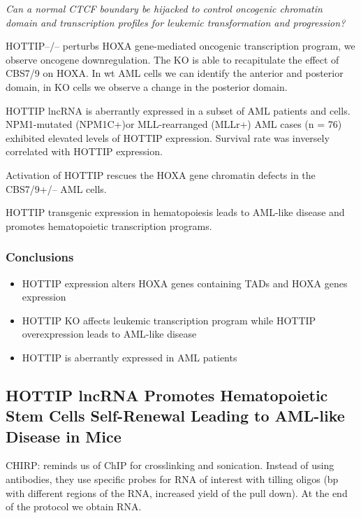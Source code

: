 \emph{Can a normal CTCF boundary be hijacked to control oncogenic chromatin domain and transcription profiles for leukemic transformation and progression?}

HOTTIP--/-- perturbs HOXA gene-mediated oncogenic transcription program, we observe oncogene downregulation. The KO is able to recapitulate the effect of CBS7/9 on HOXA. In wt AML cells we can identify the anterior and posterior domain, in KO cells we observe a change in the posterior domain.

HOTTIP lncRNA is aberrantly expressed in a subset of AML patients and cells. NPM1-mutated (NPM1C+)or MLL-rearranged (MLLr+) AML cases (n = 76) exhibited elevated levels of HOTTIP expression. Survival rate was inversely correlated with HOTTIP expression.

Activation of HOTTIP rescues the HOXA gene chromatin defects in the CBS7/9+/-- AML cells.

HOTTIP transgenic expression in hematopoiesis leads to AML-like disease and promotes hematopoietic transcription programs.

\hypertarget{conclusions}{%
\subsubsection{Conclusions}\label{conclusions}}

\begin{itemize}
\tightlist
\item
  HOTTIP expression alters HOXA genes containing TADs and HOXA genes expression
\item
  HOTTIP KO affects leukemic transcription program while HOTTIP overexpression leads to AML-like disease
\item
  HOTTIP is aberrantly expressed in AML patients
\end{itemize}

\hypertarget{hottip-lncrna-promotes-hematopoietic-stem-cells-self-renewal-leading-to-aml-like-disease-in-mice}{%
\subsection{HOTTIP lncRNA Promotes Hematopoietic Stem Cells Self-Renewal Leading to AML-like Disease in Mice}\label{hottip-lncrna-promotes-hematopoietic-stem-cells-self-renewal-leading-to-aml-like-disease-in-mice}}

CHIRP: reminds us of ChIP for crosslinking and sonication. Instead of using antibodies, they use specific probes for RNA of interest with tilling oligos (bp with different regions of the RNA, increased yield of the pull down). At the end of the protocol we obtain RNA.

